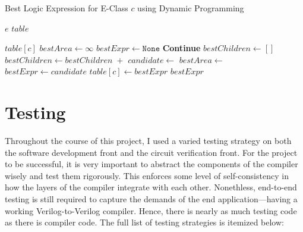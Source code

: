\documentclass[10pt,letterpaper]{article}
\begin{document}
\begin{algorithm}[h]
    \caption{Best Logic Expression for E-Class $c$ using Dynamic Programming}
    \label{alg:dynprog}
    \begin{algorithmic}[1]
        \Require $e$ 
        \Require $table$ 

        \State \Return $table[c]$ 
        \EndIf
        \State $bestArea \gets \infty$ 
        \State $bestExpr \gets \texttt{None}$ 
         
         
        \State \textbf{Continue}
        \EndIf
        \State $bestChildren \gets []$ 
         
        \State $bestChildren \gets bestChildren\; + $  
        \EndFor
        \State $candidate \gets$  
        \State $bestArea \gets$  
        \State $bestExpr \gets candidate$ 
        \EndIf
        \EndFor
        \State $table[c] \gets bestExpr$ 
        \State \Return $bestExpr$ 
        \EndFunction
    \end{algorithmic}
\end{algorithm}

\section{Testing}\label{sec:testing}

Throughout the course of this project, I used a varied testing strategy on both
the software development front and the circuit verification front. For the
project to be successful, it is very important to abstract the components of
the compiler wisely and test them rigorously. This enforces some level of
self-consistency in how the layers of the compiler integrate with each other.
Nonethless, end-to-end testing is still required to capture the demands of the
end application---having a working Verilog-to-Verilog compiler. Hence, there is
nearly as much testing code as there is compiler code. The full list of testing
strategies is itemized below:
\end{document}
